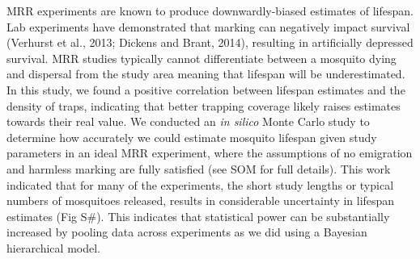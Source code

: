 \documentclass[]{article}
\begin{document}
MRR experiments are known to produce downwardly-biased estimates of
lifespan. Lab experiments have demonstrated that marking can negatively
impact survival (Verhurst et al., 2013; Dickens and Brant, 2014),
resulting in artificially depressed survival. MRR studies typically
cannot differentiate between a mosquito dying and dispersal from the
study area meaning that lifespan will be underestimated. In this study,
we found a positive correlation between lifespan estimates and the
density of traps, indicating that better trapping coverage likely raises
estimates towards their real value. We conducted an \emph{in silico}
Monte Carlo study to determine how accurately we could estimate mosquito
lifespan given study parameters in an ideal MRR experiment, where the
assumptions of no emigration and harmless marking are fully satisfied
(see SOM for full details). This work indicated that for many of the
experiments, the short study lengths or typical numbers of mosquitoes
released, results in considerable uncertainty in lifespan estimates (Fig
S\#). This indicates that statistical power can be substantially
increased by pooling data across experiments as we did using a Bayesian
hierarchical model.
\end{document}
